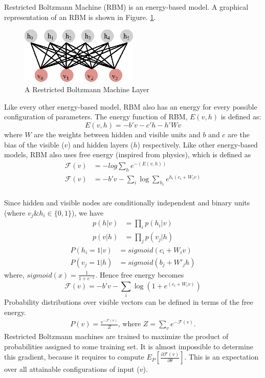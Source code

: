 Restricted Boltzmann Machine (RBM) is an energy-based model. A graphical representation of an RBM is shown in Figure. \ref{fig:rbm_layer}.

\begin{figure}[!ht]
  \centering
  \includegraphics[width=0.5\textwidth]{./imgs/rbm.eps}
  \caption{A Restricted Boltzmann Machine Layer}
  \label{fig:rbm_layer}
\end{figure}%

Like every other energy-based model, RBM also has an energy for every possible configuration of parameters. The energy function of RBM, $E(v,h)$ is defined as: 
$$E(v,h) = - b'v - c'h - h'Wv$$
where $W$ are the weights between hidden and visible units and $b$ and $c$ are the bias of the visible ($v$) and hidden layers ($h$) respectively. Like other energy-based models, RBM also uses free energy (inspired from physics), which is defined as
\begin{align*}
\mathcal{F}(v) &= -log \sum_{h}{e^{-(E(v,h))}} \\
\mathcal{F}(v) &= - b'v - \sum_i \log \sum_{h_i} e^{h_i (c_i + W_i v)}\\
\end{align*}

Since hidden and visible nodes are conditionally independent and binary units (where $v_j \& h_i \in \{0,1\}$), we have 
\begin{align}
p(h|v) &= \prod_i p(h_i|v) \\
p(v|h) &= \prod_j p(v_j|h) 
\end{align}
\begin{align}
P(h_i=1|v) &= sigmoid(c_i + W_i v) \label{eq:rbm_layers_prob1} \\
P(v_j=1|h) &= sigmoid(b_j + W'_j h) \label{eq:rbm_layers_prob2}
\end{align}
where, $sigmoid(x)= \frac{1}{1 + e^{-x}}$. Hence free energy becomes
$$\mathcal{F}(v)= - b'v - \sum_i \log(1 + e^{(c_i + W_i v)})$$ %
Probability distributions over visible vectors can be defined in terms of the free energy.
\begin{align*}
P(v) = \frac{e^{-\mathcal{F}(v)}}{Z} \text{, where } Z=\sum_v e^{-\mathcal{F}(v)}.
\end{align*}
Restricted Boltzmann machines are trained to maximize the product of probabilities assigned to some training set. It is almost impossible to determine this gradient, because it requires to compute $E_P[\frac{\partial \mathcal{F}(v)} {\partial \theta} ]$. This is an expectation over all attainable configurations of input ($v$). \cite{hinton2010practical}

